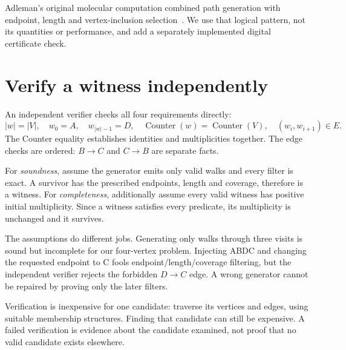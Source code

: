 Adleman's original molecular computation combined path generation with
endpoint, length and vertex-inclusion selection~\cite{Adleman1994}. We use that
logical pattern, not its quantities or performance, and add a separately
implemented digital certificate check.

\section{Verify a witness independently}
An independent verifier checks all four requirements directly:
\begin{equation}
 |w|=|V|,\quad w_0=A,\quad w_{|w|-1}=D,\quad
 \operatorname{Counter}(w)=\operatorname{Counter}(V),\quad
 (w_i,w_{i+1})\in E.
\end{equation}
The Counter equality establishes identities and multiplicities together.
The edge checks are ordered: $B\to C$ and $C\to B$ are separate facts.

For \emph{soundness}, assume the generator emits only valid walks and every
filter is exact. A survivor has the prescribed endpoints, length and coverage,
therefore is a witness. For \emph{completeness}, additionally assume every
valid witness has positive initial multiplicity. Since a witness satisfies
every predicate, its multiplicity is unchanged and it survives.

The assumptions do different jobs. Generating only walks through three visits
is sound but incomplete for our four-vertex problem. Injecting ABDC and changing
the requested endpoint to C fools endpoint/length/coverage filtering, but the
independent verifier rejects the forbidden $D\to C$ edge. A wrong generator
cannot be repaired by proving only the later filters.

Verification is inexpensive for one candidate: traverse its vertices and
edges, using suitable membership structures. Finding that candidate can
still be expensive. A failed verification is evidence about the candidate
examined, not proof that no valid candidate exists elsewhere.

